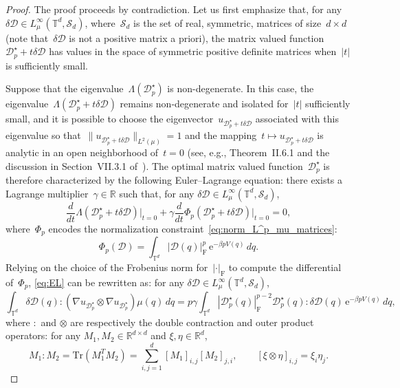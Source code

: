 \documentclass{article}
\newcommand{\rme}{\mathrm{e}}
\newcommand{\R}{\mathbb{R}}
\def\R{\mathbb{R}}
\def\T{\mathbb{T}}
\newcommand{\Diff}{\mathcal{D}}
\newcommand{\F}{\mathrm{F}}
\newcommand{\normF}[1]{\left| #1 \right|_{\F}}
\renewcommand{\dim}{d}
\begin{document}
\begin{proof}
  The proof proceeds by contradiction. Let us first emphasize that, for any $\delta \Diff \in L_\mu^{\infty}(\T^\dim,\mathcal{S}_\dim)$, where~$\mathcal{S}_\dim$ is the set of real, symmetric, matrices of size~$d \times d$ (note that~$\delta \Diff$ is not a positive matrix a priori), the matrix valued function~$\Diff_p^{\star} + t\delta\Diff$ has values in the space of symmetric positive definite matrices when~$|t|$ is sufficiently small.

  Suppose that the eigenvalue~$\Lambda(\Diff_p^{\star})$ is non-degenerate. In this case, the eigenvalue~$\Lambda(\Diff_p^{\star} + t\delta\Diff)$ remains non-degenerate and isolated for~$|t|$ sufficiently small, and it is possible to choose the eigenvector~$u_{\Diff_p^{\star} + t\delta\Diff}$ associated with this eigenvalue so that~$\|u_{\Diff_p^{\star} + t\delta\Diff}\|_{L^2(\mu)} = 1$ and the mapping~$t\mapsto u_{\Diff_p^{\star} + t\delta\Diff}$ is analytic in an open neighborhood of~$t=0$ (see, e.g., Theorem~II.6.1 and the discussion in Section~VII.3.1 of~\cite{Kato}). The optimal matrix valued function~$\Diff^{\star}_p$ is therefore characterized by the following Euler--Lagrange equation: there exists a Lagrange multiplier~$\gamma \in \R$ such that, for any $\delta \Diff \in L_\mu^{\infty}(\T^\dim,\mathcal{S}_\dim)$,
  \begin{equation}
    \label{eq:EL}
    \frac{d}{dt}{\Lambda}(\Diff_p^\star + t\delta\Diff)\Big|_{t=0} + \gamma \frac{d}{dt}\Phi_p(\Diff_p^\star + t\delta\Diff)\Big|_{t=0} = 0,
  \end{equation}
  where~$\Phi_p$ encodes the normalization constraint~\eqref{eq:norm_L^p_mu_matrices}:
  \[
  \Phi_p(\Diff) = \int_{\T^\dim} \normF{\Diff(q)}^p \, \rme^{-\beta p V(q)} \,dq.
  \]
  Relying on the choice of the Frobenius norm for~$\normF{\cdot}$ to compute the differential of~$\Phi_p$, \eqref{eq:EL} can be rewritten as: for any $\delta \Diff \in L_\mu^{\infty}(\T^\dim,\mathcal{S}_\dim)$,
\[
\int_{\T^\dim} \delta\Diff(q) : \left( \nabla u_{\Diff^{\star}_p}\otimes\nabla u_{\Diff^{\star}_p} \right) \mu(q)\,dq = p\gamma\int_{\T^\dim}\normF{\Diff_p^{\star}(q)}^{p-2}\Diff^{\star}_p(q):\delta\Diff(q) \, \rme^{-\beta p V(q)}\,dq,
\]
where $:$ and $\otimes$ are respectively the double contraction and outer product operators: for any $M_1,M_2 \in \mathbb{R}^{\dim \times \dim}$ and $\xi,\eta \in \mathbb{R}^\dim$, 
\[
M_1:M_2 = \mathrm{Tr}\left(M_1^T M_2\right) = \sum_{i,j=1}^\dim \left[M_1\right]_{i,j} \left[M_2\right]_{j,i},
\qquad
\left[\xi \otimes \eta\right]_{i,j} = \xi_i\eta_j.
\]
\end{proof}
\end{document}
